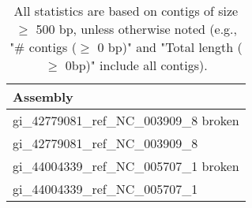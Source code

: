 \documentclass[12pt,a4paper]{article}
\begin{document}
\begin{table}[ht]
\begin{center}
\caption{All statistics are based on contigs of size $\geq$ 500 bp, unless otherwise noted (e.g., "\# contigs ($\geq$ 0 bp)" and "Total length ($\geq$ 0bp)" include all contigs).}
\begin{tabular}{|l*{0}{|r}|}
\hline
Assembly \\ \hline
gi\_42779081\_ref\_NC\_003909\_8 broken \\ \hline
gi\_42779081\_ref\_NC\_003909\_8 \\ \hline
gi\_44004339\_ref\_NC\_005707\_1 broken \\ \hline
gi\_44004339\_ref\_NC\_005707\_1 \\ \hline
\end{tabular}
\end{center}
\end{table}
\end{document}
